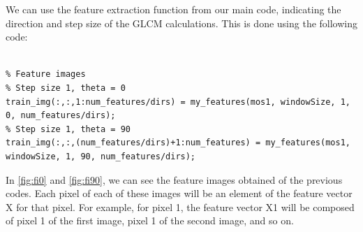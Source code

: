 \documentclass[a4paper, article, oneside, UKenglish]{memoir}
\newcommand{\0}{\mathbf{0}}
\newcommand{\1}{\mathbf{1}}
\begin{document}
We can use the feature extraction function from our main code, indicating the direction and step size of the GLCM calculations. This is done using the following code:

\begin{lstlisting}[basicstyle=\tiny, frame=single]  % Inicia el bloque de código

% Feature images
% Step size 1, theta = 0
train_img(:,:,1:num_features/dirs) = my_features(mos1, windowSize, 1, 0, num_features/dirs);
% Step size 1, theta = 90
train_img(:,:,(num_features/dirs)+1:num_features) = my_features(mos1, windowSize, 1, 90, num_features/dirs);

\end{lstlisting}

In \cref{fig:fi0} and \cref{fig:fi90}, we can see the feature images obtained of the previous codes. Each pixel of each of these images will be an element of the feature vector X for that pixel. For example, for pixel 1, the feature vector X1 will be composed of pixel 1 of the first image, pixel 1 of the second image, and so on.
\end{document}
